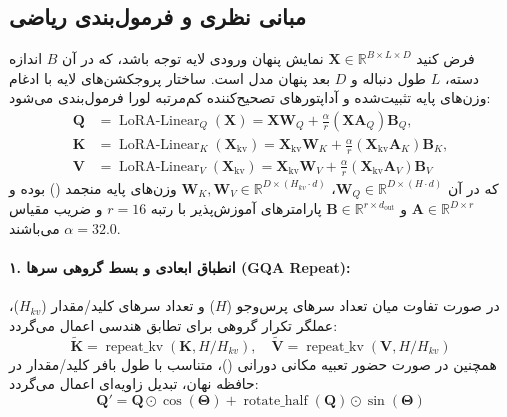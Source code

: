 \subsection{مبانی نظری و فرمول‌بندی ریاضی}
فرض کنید $\mathbf{X} \in \mathbb{R}^{B \times L \times D}$ نمایش پنهان ورودی لایه توجه باشد، که در آن $B$ اندازه دسته، $L$ طول دنباله و $D$ بعد پنهان مدل است. ساختار پروجکشن‌های لایه با ادغام وزن‌های پایه تثبیت‌شده و آداپتورهای تصحیح‌کننده کم‌مرتبه لورا فرمول‌بندی می‌شود:
\begin{align}
\mathbf{Q} &= \operatorname{LoRA-Linear}_Q(\mathbf{X}) = \mathbf{X} \mathbf{W}_Q + \frac{\alpha}{r} (\mathbf{X} \mathbf{A}_Q) \mathbf{B}_Q, \\
\mathbf{K} &= \operatorname{LoRA-Linear}_K(\mathbf{X}_{\text{kv}}) = \mathbf{X}_{\text{kv}} \mathbf{W}_K + \frac{\alpha}{r} (\mathbf{X}_{\text{kv}} \mathbf{A}_K) \mathbf{B}_K, \\
\mathbf{V} &= \operatorname{LoRA-Linear}_V(\mathbf{X}_{\text{kv}}) = \mathbf{X}_{\text{kv}} \mathbf{W}_V + \frac{\alpha}{r} (\mathbf{X}_{\text{kv}} \mathbf{A}_V) \mathbf{B}_V
\end{align}
که در آن $\mathbf{W}_Q \in \mathbb{R}^{D \times (H \cdot d)}$، $\mathbf{W}_K, \mathbf{W}_V \in \mathbb{R}^{D \times (H_{kv} \cdot d)}$ وزن‌های پایه منجمد () بوده و $\mathbf{A} \in \mathbb{R}^{D \times r}$ و $\mathbf{B} \in \mathbb{R}^{r \times d_{\text{out}}}$ پارامترهای آموزش‌پذیر با رتبه $r = 16$ و ضریب مقیاس $\alpha = 32.0$ می‌باشند.

\paragraph{۱. انطباق ابعادی و بسط گروهی سرها (GQA Repeat):}
در صورت تفاوت میان تعداد سرهای پرس‌وجو ($H$) و تعداد سرهای کلید/مقدار ($H_{kv}$)، عملگر تکرار گروهی برای تطابق هندسی اعمال می‌گردد:
\begin{equation}
\tilde{\mathbf{K}} = \operatorname{repeat\_kv}(\mathbf{K}, H / H_{kv}), \quad \tilde{\mathbf{V}} = \operatorname{repeat\_kv}(\mathbf{V}, H / H_{kv})
\end{equation}
همچنین در صورت حضور تعبیه مکانی دورانی ()، متناسب با طول بافر کلید/مقدار در حافظه نهان، تبدیل زاویه‌ای اعمال می‌گردد:
\begin{equation}
\mathbf{Q}' = \mathbf{Q} \odot \cos(\mathbf{\Theta}) + \operatorname{rotate\_half}(\mathbf{Q}) \odot \sin(\mathbf{\Theta})
\end{equation}

